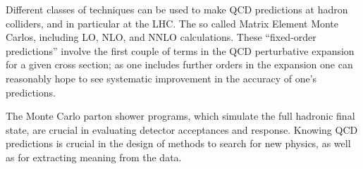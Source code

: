 Different classes of techniques can be used to make QCD predictions at hadron colliders, and in particular at the LHC. 
The so called Matrix Element Monte Carlos, including LO, NLO, and NNLO calculations. These ``fixed-order predictions'' involve the first couple of terms in the QCD perturbative expansion for a given cross section; as one includes further orders in the expansion one can reasonably hope to see systematic improvement in the accuracy of one's predictions.

The Monte Carlo parton shower programs, which simulate the full hadronic final state, are crucial in evaluating detector acceptances and response.  
Knowing QCD predictions is crucial in the design of methods to search for new physics, as well as for extracting meaning from the data.

